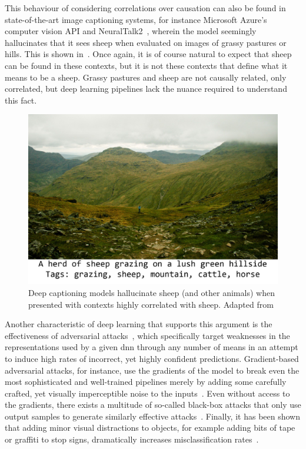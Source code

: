 	This behaviour of considering correlations over causation can also be found in state-of-the-art image captioning systems, for instance Microsoft Azure's computer vision API and NeuralTalk2~\cite{electric_sheep}, wherein the model seemingly hallucinates that it sees sheep when evaluated on images of grassy pastures or hills. This is shown in~. Once again, it is of course natural to expect that sheep can be found in these contexts, but it is not these contexts that define what it means to be a sheep. Grassy pastures and sheep are not causally related, only correlated, but deep learning pipelines lack the nuance required to understand this fact. 
	\begin{figure}[htb]
		\includegraphics[width=\linewidth]{illustrations/sheep.jpg}
		\caption[Deep Hallucination]{Deep captioning models hallucinate sheep (and other animals) when presented with contexts highly correlated with sheep. Adapted from~\cite{electric_sheep}}
		\label{sheep}
	\end{figure}

	Another characteristic of deep learning that supports this argument is the effectiveness of adversarial attacks~\cite{adversarial_bugs_features}, which specifically target weaknesses in the representations used by a given \gls{dnn} through any number of means in an attempt to induce high rates of incorrect, yet highly confident predictions. Gradient-based adversarial attacks, for instance, use the gradients of the model to break even the most sophisticated and well-trained pipelines merely by adding some carefully crafted, yet visually imperceptible noise to the inputs~\cite{adversarial_attacks}. Even without access to the gradients, there exists a multitude of so-called black-box attacks that only use output samples to generate similarly effective attacks~\cite{blackbox_adv}. Finally, it has been shown that adding minor visual distractions to objects, for example adding bits of tape or graffiti to stop signs, dramatically increases misclassification rates~\cite{physical_attacks}. 
	
